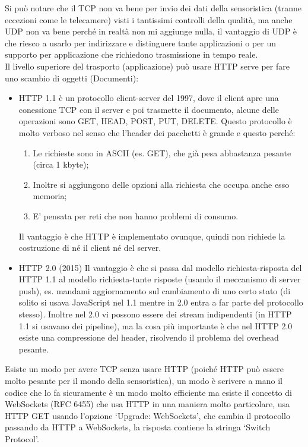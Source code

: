 \documentclass[11pt, twocolumn]{article}
\newenvironment{myitemize}
{ \begin{itemize}[topsep=0ex]
		\setlength{\itemsep}{0pt}
		\setlength{\parskip}{0pt}
		\setlength{\parsep}{0pt}     }
	{ \end{itemize}                  }
\newenvironment{myenumerate}
{ \begin{enumerate}[topsep=0ex]
		\setlength{\itemsep}{0pt}
		\setlength{\parskip}{0pt}
		\setlength{\parsep}{0pt}     }
	{ \end{enumerate}                  }
\begin{document}
Si può notare che il TCP non va bene per invio dei dati della sensoristica (tranne eccezioni come le telecamere) visti i tantissimi controlli della qualità, ma anche UDP non va bene perché in realtà non mi aggiunge nulla, il vantaggio di UDP è che riesco a usarlo per indirizzare e distinguere tante applicazioni o per un supporto per applicazione che richiedono trasmissione in tempo reale. \\
Il livello superiore del trasporto (applicazione) può usare HTTP serve per fare uno scambio di oggetti (Documenti): 
\begin{myitemize} 
  \item HTTP 1.1 è un protocollo client-server del 1997, dove il client apre una conessione TCP con il server e poi trasmette il documento, alcune delle operazioni sono GET, HEAD, POST, PUT, DELETE.
Questo protocollo è molto verboso nel senso che l'header dei pacchetti è grande e questo perché: 
  \begin{myenumerate} 
    \item Le richieste sono in ASCII (es. GET), che già pesa abbastanza pesante (circa 1 kbyte); 
    \item  Inoltre si aggiungono delle opzioni alla richiesta che occupa anche esso memoria;
    \item E' pensata per reti che non hanno problemi di consumo.
  \end{myenumerate} 
Il vantaggio è che HTTP è implementato ovunque, quindi non richiede la costruzione di né il client né del server. 

  \item HTTP 2.0 (2015) Il vantaggio è che si passa dal modello richiesta-risposta del HTTP 1.1 al modello richiesta-tante risposte (usando il meccanismo di server push), es. mandami aggiornamento sul cambiamento di uno certo stato (di solito si usava JavaScript nel 1.1 mentre in 2.0 entra a far parte del protocollo stesso). 
Inoltre nel 2.0 vi possono essere dei stream indipendenti (in HTTP 1.1 si usavano dei pipeline), ma la cosa più importante è che nel HTTP 2.0 esiste una compressione del header, risolvendo il problema del overhead pesante.
\end{myitemize} 
Esiste un modo per avere TCP senza usare HTTP (poiché HTTP può essere molto pesante per il mondo della sensoristica), un modo è scrivere a mano il codice che lo fa sicuramente è un modo molto efficiente ma esiste il concetto di WebSockets (RFC 6455) che usa HTTP in una maniera molto particolare, usa HTTP GET usando l'opzione `Upgrade: WebSockets', che cambia il protocollo passando da HTTP a WebSockets, la risposta contiene la stringa `Switch Protocol'.
\end{document}
